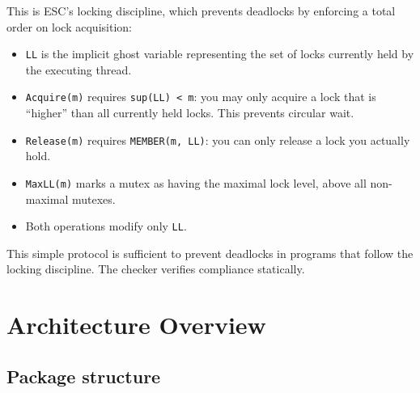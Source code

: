 \documentclass[11pt]{article}
\newcommand{\m}[1]{\texttt{#1}}
\begin{document}
This is ESC's locking discipline, which prevents deadlocks by
enforcing a total order on lock acquisition:

\begin{itemize}[nosep]
  \item \m{LL} is the implicit ghost variable representing the set of
    locks currently held by the executing thread.
  \item \m{Acquire(m)} requires \m{sup(LL) < m}: you may only acquire
    a lock that is ``higher'' than all currently held locks.  This
    prevents circular wait.
  \item \m{Release(m)} requires \m{MEMBER(m, LL)}: you can only
    release a lock you actually hold.
  \item \m{MaxLL(m)} marks a mutex as having the maximal lock level,
    above all non-maximal mutexes.
  \item Both operations modify only \m{LL}.
\end{itemize}

This simple protocol is sufficient to prevent deadlocks in programs
that follow the locking discipline.  The checker verifies compliance
statically.

\section{Architecture Overview}
\label{sec:arch}

\subsection{Package structure}
\end{document}
